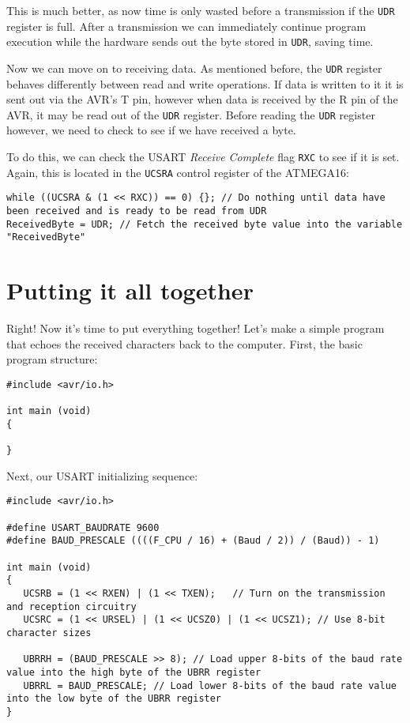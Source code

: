 \documentclass[a4paper,oneside,notitlepage]{book}
\begin{document}
This is much better, as now time is only wasted before a transmission if the \texttt{UDR} register is full. After a transmission we can immediately continue program execution while the hardware sends out the byte stored in \texttt{UDR}, saving time.


Now we can move on to receiving data. As mentioned before, the \texttt{UDR} register behaves differently between read and write operations. If data is written to it it is sent out via the AVR's T pin, however when data is received by the R pin of the AVR, it may be read out of the \texttt{UDR} register. Before reading the \texttt{UDR} register however, we need to check to see if we have received a byte.

To do this, we can check the USART \emph{Receive Complete} flag \texttt{RXC} to see if it is set. Again, this is located in the \texttt{UCSRA} control register of the ATMEGA16:

\begin{center}
\begin{lstlisting}
while ((UCSRA & (1 << RXC)) == 0) {}; // Do nothing until data have been received and is ready to be read from UDR
ReceivedByte = UDR; // Fetch the received byte value into the variable "ReceivedByte"
\end{lstlisting}
\end{center}

\chapter{Putting it all together}

Right! Now it's time to put everything together! Let's make a simple program that echoes the received characters back to the computer. First, the basic program structure:

\begin{center}
\begin{lstlisting}
#include <avr/io.h>

int main (void)
{

}
\end{lstlisting}
\end{center}

Next, our USART initializing sequence:

\begin{center}
\begin{lstlisting}
#include <avr/io.h>

#define USART_BAUDRATE 9600
#define BAUD_PRESCALE ((((F_CPU / 16) + (Baud / 2)) / (Baud)) - 1)

int main (void)
{
   UCSRB = (1 << RXEN) | (1 << TXEN);   // Turn on the transmission and reception circuitry
   UCSRC = (1 << URSEL) | (1 << UCSZ0) | (1 << UCSZ1); // Use 8-bit character sizes

   UBRRH = (BAUD_PRESCALE >> 8); // Load upper 8-bits of the baud rate value into the high byte of the UBRR register
   UBRRL = BAUD_PRESCALE; // Load lower 8-bits of the baud rate value into the low byte of the UBRR register
}
\end{lstlisting}
\end{center}
\end{document}

